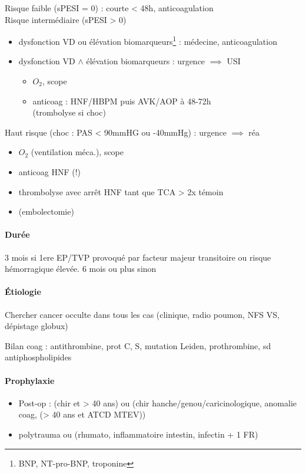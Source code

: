 Risque faible (sPESI = 0) : \faHospitalO{} courte < 48h, anticoagulation\\
Risque intermédiaire (sPESI > 0)
\begin{itemize}
\item dysfonction VD ou élévation biomarqueurs\footnote{BNP, NT-pro-BNP,
    troponine} : \faHospitalO{}
  médecine, anticoagulation
\item dysfonction VD $\wedge$ élévation biomarqueurs : urgence \danger{}
  $\implies$ USI
  \begin{itemize}
  \item $O_2$, scope
  \item anticoag : HNF/HBPM puis AVK/AOP à 48-72h\\
  (trombolyse si choc)
    \end{itemize}

\end{itemize}
Haut risque (choc : PAS < 90mmHG ou -40mmHg) : urgence \skull $\implies$ réa
\begin{itemize}
\item $O_2$ (ventilation méca.), scope
\item anticoag HNF (!)
\item thrombolyse avec arrêt HNF tant que TCA > 2x témoin
\item (embolectomie)
\end{itemize}

\paragraph{Durée}
3 mois si 1ere EP/TVP provoqué par facteur majeur transitoire ou risque
hémorragique élevée. 6 mois ou plus sinon

\paragraph{Étiologie}
Chercher cancer occulte dans tous les cas (clinique, radio poumon, NFS VS,
dépistage globux)

Bilan coag : {antithrombine, prot C, S}, mutation {Leiden, prothrombine}, sd
antiphospholipides

\paragraph{Prophylaxie}
\begin{itemize}
\item Post-op : (chir et > 40 ans) ou (chir hanche/genou/caricinologique, anomalie
  coag, (> 40 ans et ATCD MTEV))
\item polytrauma ou ({rhumato, inflammatoire intestin, infectin} + 1 FR)

\end{itemize}

